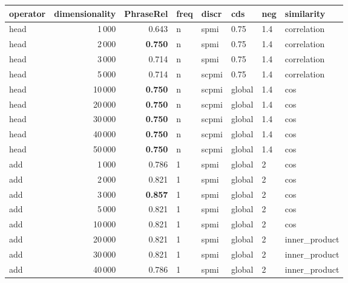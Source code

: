 \begin{tabular}{lrrlllll}
\toprule
operator &  dimensionality &  PhraseRel &  freq &  discr &     cds &  neg &     similarity \\
\midrule
    head &            1\,000 &      0.643 &     n &   spmi &    0.75 &  1.4 &    correlation \\
    head &            2\,000 &      \textbf{0.750} &     n &   spmi &    0.75 &  1.4 &    correlation \\
    head &            3\,000 &      0.714 &     n &   spmi &    0.75 &  1.4 &    correlation \\
    head &            5\,000 &      0.714 &     n &  scpmi &    0.75 &  1.4 &    correlation \\
    head &           10\,000 &      \textbf{0.750} &     n &  scpmi &  global &  1.4 &            cos \\
    head &           20\,000 &      \textbf{0.750} &     n &  scpmi &  global &  1.4 &            cos \\
    head &           30\,000 &      \textbf{0.750} &     n &  scpmi &  global &  1.4 &            cos \\
    head &           40\,000 &      \textbf{0.750} &     n &  scpmi &  global &  1.4 &            cos \\
    head &           50\,000 &      \textbf{0.750} &     n &  scpmi &  global &  1.4 &            cos \\ \addlinespace
     add &            1\,000 &      0.786 &     1 &   spmi &  global &    2 &            cos \\
     add &            2\,000 &      0.821 &     1 &   spmi &  global &    2 &            cos \\
     add &            3\,000 &      \textbf{0.857} &     1 &   spmi &  global &    2 &            cos \\
     add &            5\,000 &      0.821 &     1 &   spmi &  global &    2 &            cos \\
     add &           10\,000 &      0.821 &     1 &   spmi &  global &    2 &            cos \\
     add &           20\,000 &      0.821 &     1 &   spmi &  global &    2 &  inner\_product \\
     add &           30\,000 &      0.821 &     1 &   spmi &  global &    2 &  inner\_product \\
     add &           40\,000 &      0.786 &     1 &   spmi &  global &    2 &  inner\_product \\

\end{tabular}
